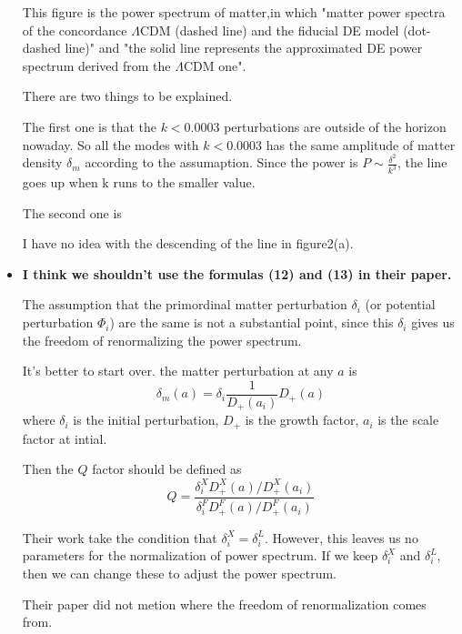 \documentclass{article}
\begin{document}
\begin{itemize}
This figure is the power spectrum of matter,in which "matter power spectra of the concordance $\Lambda$CDM (dashed line) and the ﬁducial DE model (dot-dashed line)" and "the solid line represents the approximated DE power spectrum derived from the $\Lambda$CDM one".

There are two things to be explained.

The first one is that the $k<0.0003$ perturbations are outside of the horizon nowaday. So all the modes with $k<0.0003$ has the same amplitude of matter density $\delta_m$ according to the assumaption. Since the power is $P\sim \frac{\delta^2}{k^{3}}$, the line goes up when k runs to the smaller value.

The second one is 



I have no idea with the descending of the line in figure2(a).






\item
{\bf I think we shouldn't use the formulas (12) and (13) in their paper.}

The assumption that the primordinal matter perturbation $\delta_i$ (or potential perturbation $\Phi_i$) are the same is not a substantial point, since this $\delta_i$ gives us the freedom of renormalizing the power spectrum.

It's better to start over. the matter perturbation at any $a$ is
\[
\delta_m(a)=\delta_i \frac{1}{D_+(a_i)}D_+(a)
\]
where $\delta_i$ is the initial perturbation, $D_+$ is the growth factor, $a_i$ is the scale factor at intial.

Then the $Q$ factor should be defined as
\[
Q=\frac{\delta_i^X D_+^X(a)/D_+^X(a_i)}{\delta_i^F D_+^F(a)/D_+^F(a_i)}
\]

Their work take the condition that $\delta_i^X=\delta_i^L$. However, this leaves us no parameters for the normalization of power spectrum. If we keep $\delta_i^X$ and $\delta_i^L$, then we can change these to adjust the power spectrum.

Their paper did not metion where the freedom of renormalization comes from.





\end{itemize}
\end{document}
